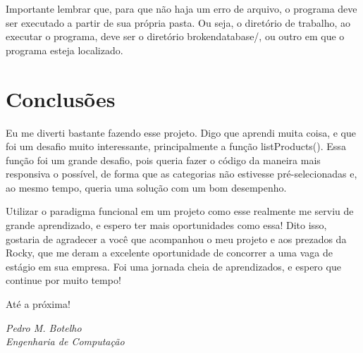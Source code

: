 \documentclass[12pt]{article}
\begin{document}
Importante lembrar que, para que não haja um erro de arquivo, o programa deve ser executado a partir de sua própria pasta. Ou seja, o diretório de trabalho, ao executar o programa, deve ser o diretório brokendatabase/, ou outro em que o programa esteja localizado.

\section{Conclusões}

Eu me diverti bastante fazendo esse projeto. Digo que aprendi muita coisa, e que foi um desafio muito interessante, principalmente a função listProducts(). Essa função foi um grande desafio, pois queria fazer o código da maneira mais responsiva o possível, de forma que as categorias não estivesse pré-selecionadas e, ao mesmo tempo, queria uma solução com um bom desempenho. 

Utilizar o paradigma funcional em um projeto como esse realmente me serviu de grande aprendizado, e espero ter mais oportunidades como essa! Dito isso, gostaria de agradecer a você que acompanhou o meu projeto e aos prezados da Rocky, que me deram a excelente oportunidade de concorrer a uma vaga de estágio em sua empresa. Foi uma jornada cheia de aprendizados, e espero que continue por muito tempo!

Até a próxima!

\begin{flushright}
\textit{Pedro M. Botelho\\Engenharia de Computação}
\end{flushright}
\end{document}
